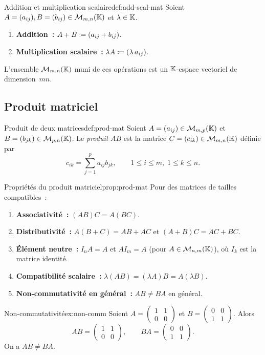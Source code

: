 \begin{definition}{Addition et multiplication scalaire}{def:add-scal-mat}
  Soient $A=(a_{ij}),B=(b_{ij})\in\mathcal{M}_{m,n}({\mathbb{K}})$ et $\lambda\in{\mathbb{K}}$.
  \begin{enumerate}[label=(\roman*)]
    \item \textbf{Addition~:} $A+B\coloneqq(a_{ij}+b_{ij})$.
    \item \textbf{Multiplication scalaire~:} $\lambda A\coloneqq(\lambda\,a_{ij})$.
  \end{enumerate}
  L'ensemble $\mathcal{M}_{m,n}({\mathbb{K}})$ muni de ces opérations est un ${\mathbb{K}}$-espace
  vectoriel de dimension~$mn$.
\end{definition}

\subsection{Produit matriciel}\label{subsec:prod-mat}

\begin{definition}{Produit de deux matrices}{def:prod-mat}
  Soient $A=(a_{ij})\in\mathcal{M}_{m,p}({\mathbb{K}})$ et $B=(b_{jk})\in\mathcal{M}_{p,n}({\mathbb{K}})$.
  Le \emph{produit} $AB$ est la matrice
  $C=(c_{ik})\in\mathcal{M}_{m,n}({\mathbb{K}})$ définie par
  \[
    c_{ik}=\sum_{j=1}^{p}a_{ij}b_{jk},\qquad
    1\leq i\leq m,\;1\leq k\leq n.
  \]
\end{definition}

\begin{proposition}{Propriétés du produit matriciel}{prop:prod-mat}
  Pour des matrices de tailles compatibles~:
  \begin{enumerate}[label=(\roman*)]
    \item \textbf{Associativité~:} $(AB)C=A(BC)$.
    \item \textbf{Distributivité~:} $A(B+C)=AB+AC$ et $(A+B)C=AC+BC$.
    \item \textbf{Élément neutre~:} $I_n A=A$ et $AI_m=A$ (pour
      $A\in\mathcal{M}_{n,m}({\mathbb{K}})$), où $I_k$ est la matrice identité.
    \item \textbf{Compatibilité scalaire~:} $\lambda(AB)=(\lambda A)B=A(\lambda B)$.
    \item \textbf{Non-commutativité en général~:} $AB\neq BA$ en général.
  \end{enumerate}
\end{proposition}

\begin{example}{Non-commutativité}{ex:non-comm}
  Soient $A=\begin{pmatrix}1&1\\0&0\end{pmatrix}$ et
  $B=\begin{pmatrix}0&0\\1&1\end{pmatrix}$. Alors
  \[
    AB=\begin{pmatrix}1&1\\0&0\end{pmatrix},\qquad
    BA=\begin{pmatrix}0&0\\1&1\end{pmatrix}.
  \]
  On a $AB\neq BA$.
\end{example}

